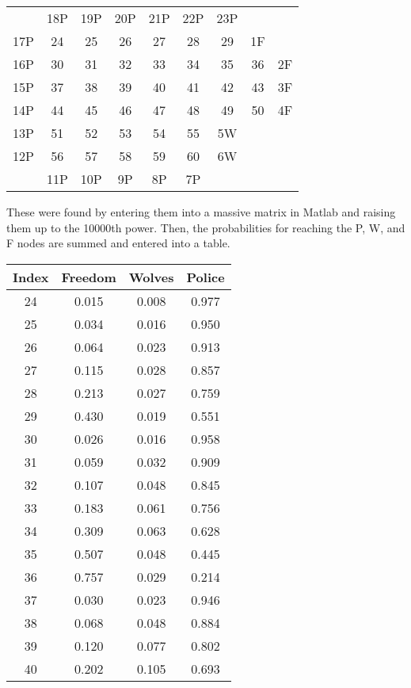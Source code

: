 \documentclass[10pt,a4paper]{exam}
\begin{document}
\begin{questions}
\begin{solution}
\begin{center}
\begin{tabular}{ccccccccc}
   & 18P & 19P & 20P & 21P & 22P & 23P &    &   \\
17P & 24 & 25 & 26 & 27 & 28 & 29 & 1F  &   \\
16P & 30 & 31 & 32 & 33 & 34 & 35 & 36 & 2F \\
15P & 37 & 38 & 39 & 40 & 41 & 42 & 43 & 3F \\
14P & 44 & 45 & 46 & 47 & 48 & 49 & 50 & 4F \\
13P & 51 & 52 & 53 & 54 & 55 & 5W  &    &   \\
12P & 56 & 57 & 58 & 59 & 60 & 6W &    &   \\
   & 11P & 10P & 9P  & 8P  & 7P  &    &    &  
\end{tabular}
\end{center}
These were found by entering them into a massive matrix in Matlab and raising them up to the 10000th power. Then, the probabilities for reaching the P, W, and F nodes are summed and entered into a table.
\pagebreak
\begin{center}
\begin{tabular}{@{}cccc@{}}
\toprule
Index & Freedom & Wolves & Police \\ \midrule
24    & 0.015   & 0.008  & 0.977  \\
25    & 0.034   & 0.016  & 0.950  \\
26    & 0.064   & 0.023  & 0.913  \\
27    & 0.115   & 0.028  & 0.857  \\
28    & 0.213   & 0.027  & 0.759  \\
29    & 0.430   & 0.019  & 0.551  \\
30    & 0.026   & 0.016  & 0.958  \\
31    & 0.059   & 0.032  & 0.909  \\
32    & 0.107   & 0.048  & 0.845  \\
33    & 0.183   & 0.061  & 0.756  \\
34    & 0.309   & 0.063  & 0.628  \\
35    & 0.507   & 0.048  & 0.445  \\
36    & 0.757   & 0.029  & 0.214  \\
37    & 0.030   & 0.023  & 0.946  \\
38    & 0.068   & 0.048  & 0.884  \\
39    & 0.120   & 0.077  & 0.802  \\
40    & 0.202   & 0.105  & 0.693  \\

\end{tabular}
\end{center}
\end{solution}
\end{questions}
\end{document}
